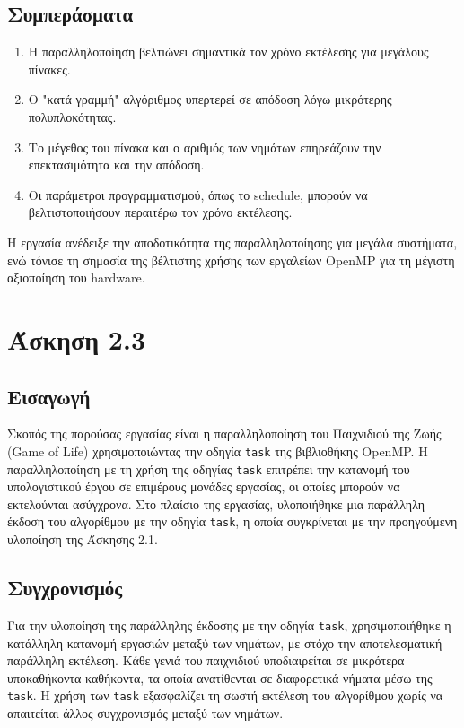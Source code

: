 \documentclass{article}
\begin{document}
\subsection*{Συμπεράσματα} 
\begin{enumerate} 
    \item Η παραλληλοποίηση βελτιώνει σημαντικά τον χρόνο εκτέλεσης για μεγάλους πίνακες. 
    \item Ο "κατά γραμμή" αλγόριθμος υπερτερεί σε απόδοση λόγω μικρότερης πολυπλοκότητας. 
    \item Το μέγεθος του πίνακα και ο αριθμός των νημάτων επηρεάζουν την επεκτασιμότητα και την απόδοση. 
    \item Οι παράμετροι προγραμματισμού, όπως το schedule, μπορούν να βελτιστοποιήσουν περαιτέρω τον χρόνο εκτέλεσης. 
\end{enumerate} 
Η εργασία ανέδειξε την αποδοτικότητα της παραλληλοποίησης για μεγάλα συστήματα, ενώ τόνισε τη σημασία της βέλτιστης χρήσης των εργαλείων OpenMP για τη μέγιστη αξιοποίηση του hardware.
\section*{Άσκηση 2.3} 
\subsection*{Εισαγωγή} Σκοπός της παρούσας εργασίας είναι η παραλληλοποίηση του Παιχνιδιού της Ζωής (Game of Life) χρησιμοποιώντας την οδηγία \texttt{task} της βιβλιοθήκης OpenMP. Η παραλληλοποίηση με τη χρήση της οδηγίας \texttt{task} επιτρέπει την κατανομή του υπολογιστικού έργου σε επιμέρους μονάδες εργασίας, οι οποίες μπορούν να εκτελούνται ασύγχρονα. Στο πλαίσιο της εργασίας, υλοποιήθηκε μια παράλληλη έκδοση του αλγορίθμου με την οδηγία \texttt{task}, η οποία συγκρίνεται με την προηγούμενη υλοποίηση της Άσκησης 2.1.
\subsection*{Συγχρονισμός} Για την υλοποίηση της παράλληλης έκδοσης με την οδηγία \texttt{task}, χρησιμοποιήθηκε η κατάλληλη κατανομή εργασιών μεταξύ των νημάτων, με στόχο την αποτελεσματική παράλληλη εκτέλεση. Κάθε γενιά του παιχνιδιού υποδιαιρείται σε μικρότερα υποκαθήκοντα καθήκοντα, τα οποία ανατίθενται σε διαφορετικά νήματα μέσω της \texttt{task}. Η χρήση των \texttt{task} εξασφαλίζει τη σωστή εκτέλεση του αλγορίθμου χωρίς να απαιτείται άλλος συγχρονισμός μεταξύ των νημάτων.
\end{document}
